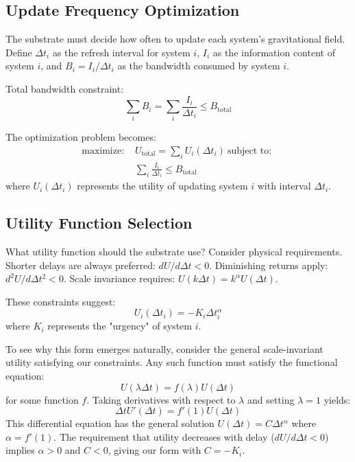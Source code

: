 \documentclass[twocolumn,prd,amsmath,amssymb,aps,superscriptaddress,nofootinbib]{revtex4-2}
\begin{document}
\subsection{Update Frequency Optimization}

The substrate must decide how often to update each system's gravitational field. Define $\Delta t_i$ as the refresh interval for system $i$, $I_i$ as the information content of system $i$, and $B_i = I_i/\Delta t_i$ as the bandwidth consumed by system $i$.

Total bandwidth constraint:
\begin{equation}
\sum_i B_i = \sum_i \frac{I_i}{\Delta t_i} \leq B_{\text{total}}
\end{equation}

The optimization problem becomes:
\begin{align}
\text{maximize: } & U_{\text{total}} = \sum_i U_i(\Delta t_i) \
\text{subject to: }\\ & \sum_i \frac{I_i}{\Delta t_i} \leq B_{\text{total}}
\end{align}
where $U_i(\Delta t_i)$ represents the utility of updating system $i$ with interval $\Delta t_i$.

\subsection{Utility Function Selection}

What utility function should the substrate use? Consider physical requirements. Shorter delays are always preferred: $dU/d\Delta t < 0$. Diminishing returns apply: $d^2U/d\Delta t^2 < 0$. Scale invariance requires: $U(k\Delta t) = k^\alpha U(\Delta t)$.

These constraints suggest:
\begin{equation}
U_i(\Delta t_i) = -K_i \Delta t_i^\alpha
\end{equation}
where $K_i$ represents the "urgency" of system $i$.

To see why this form emerges naturally, consider the general scale-invariant utility satisfying our constraints. Any such function must satisfy the functional equation:
\begin{equation}
U(\lambda \Delta t) = f(\lambda) U(\Delta t)
\end{equation}
for some function $f$. Taking derivatives with respect to $\lambda$ and setting $\lambda = 1$ yields:
\begin{equation}
\Delta t U'(\Delta t) = f'(1) U(\Delta t)
\end{equation}
This differential equation has the general solution $U(\Delta t) = C \Delta t^{\alpha}$ where $\alpha = f'(1)$. The requirement that utility decreases with delay ($dU/d\Delta t < 0$) implies $\alpha > 0$ and $C < 0$, giving our form with $C = -K_i$.
\end{document}
